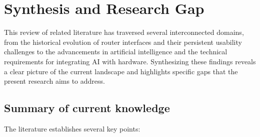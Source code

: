 \section{Synthesis and Research Gap}
This review of related literature has traversed several interconnected domains, from the historical evolution of router interfaces and their persistent usability challenges to the advancements in artificial intelligence and the technical requirements for integrating AI with hardware. Synthesizing these findings reveals a clear picture of the current landscape and highlights specific gaps that the present research aims to address.

\subsection{Summary of current knowledge}
The literature establishes several key points:

